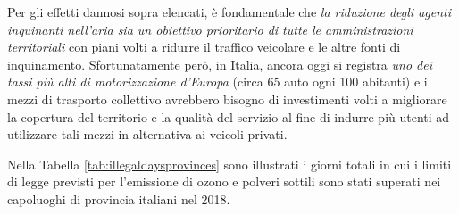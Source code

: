 Per gli effetti dannosi sopra elencati, è fondamentale che \emph{la riduzione
degli agenti inquinanti nell'aria sia un obiettivo prioritario di tutte le
amministrazioni territoriali} con piani volti a ridurre il traffico veicolare e
le altre fonti di inquinamento. Sfortunatamente però, in Italia, ancora oggi si
registra \emph{uno dei tassi più alti di motorizzazione d'Europa} (circa 65 auto
ogni 100 abitanti) e i mezzi di trasporto collettivo avrebbero bisogno di
investimenti volti a migliorare la copertura del territorio e la qualità
del servizio al fine di indurre più utenti ad utilizzare tali mezzi in
alternativa ai veicoli privati.

Nella Tabella \ref{tab:illegaldaysprovinces} sono illustrati i giorni totali in
cui i limiti di legge previsti per l'emissione di ozono e polveri sottili sono
stati superati nei capoluoghi di provincia italiani nel 2018.
